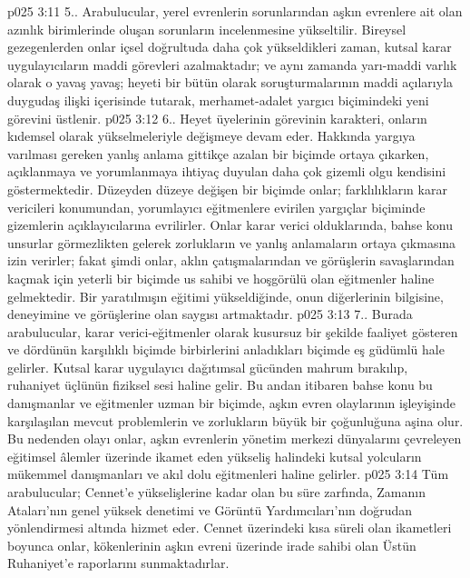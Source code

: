 \vs p025 3:11 5.\bibnobreakspace {}. Arabulucular, yerel evrenlerin sorunlarından aşkın evrenlere ait olan azınlık birimlerinde oluşan sorunların incelenmesine yükseltilir. Bireysel gezegenlerden onlar içsel doğrultuda daha çok yükseldikleri zaman, kutsal karar uygulayıcıların maddi görevleri azalmaktadır; ve aynı zamanda yarı\hyp{}maddi varlık olarak o yavaş yavaş; heyeti bir bütün olarak soruşturmalarının maddi açılarıyla duygudaş ilişki içerisinde tutarak, merhamet\hyp{}adalet yargıcı biçimindeki yeni görevini üstlenir.
\vs p025 3:12 6.\bibnobreakspace {}. Heyet üyelerinin görevinin karakteri, onların kıdemsel olarak yükselmeleriyle değişmeye devam eder. Hakkında yargıya varılması gereken yanlış anlama gittikçe azalan bir biçimde ortaya çıkarken, açıklanmaya ve yorumlanmaya ihtiyaç duyulan daha çok gizemli olgu kendisini göstermektedir. Düzeyden düzeye değişen bir biçimde onlar; farklılıkların karar vericileri konumundan, yorumlayıcı eğitmenlere evirilen yargıçlar biçiminde gizemlerin açıklayıcılarına evrilirler. Onlar karar verici olduklarında, bahse konu unsurlar görmezlikten gelerek zorlukların ve yanlış anlamaların ortaya çıkmasına izin verirler; fakat şimdi onlar, aklın çatışmalarından ve görüşlerin savaşlarından kaçmak için yeterli bir biçimde us sahibi ve hoşgörülü olan eğitmenler haline gelmektedir. Bir yaratılmışın eğitimi yükseldiğinde, onun diğerlerinin bilgisine, deneyimine ve görüşlerine olan saygısı artmaktadır.
\vs p025 3:13 7.\bibnobreakspace {}. Burada arabulucular, karar verici\hyp{}eğitmenler olarak kusursuz bir şekilde faaliyet gösteren ve dördünün karşılıklı biçimde birbirlerini anladıkları biçimde eş güdümlü hale gelirler. Kutsal karar uygulayıcı dağıtımsal gücünden mahrum bırakılıp, ruhaniyet üçlünün fiziksel sesi haline gelir. Bu andan itibaren bahse konu bu danışmanlar ve eğitmenler uzman bir biçimde, aşkın evren olaylarının işleyişinde karşılaşılan mevcut problemlerin ve zorlukların büyük bir çoğunluğuna aşina olur. Bu nedenden olayı onlar, aşkın evrenlerin yönetim merkezi dünyalarını çevreleyen eğitimsel âlemler üzerinde ikamet eden yükseliş halindeki kutsal yolcuların mükemmel danışmanları ve akıl dolu eğitmenleri haline gelirler.
\vs p025 3:14 Tüm arabulucular; Cennet’e yükselişlerine kadar olan bu süre zarfında, Zamanın Ataları’nın genel yüksek denetimi ve Görüntü Yardımcıları’nın doğrudan yönlendirmesi altında hizmet eder. Cennet üzerindeki kısa süreli olan ikametleri boyunca onlar, kökenlerinin aşkın evreni üzerinde irade sahibi olan Üstün Ruhaniyet’e raporlarını sunmaktadırlar.
